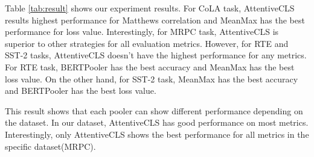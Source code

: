 \documentclass[UTF8]{article}
\begin{document}
Table \ref{tab:result} shows our experiment results. 
For CoLA task, AttentiveCLS results highest performance for Matthews correlation and MeanMax has the best performance for loss value.
Interestingly, for MRPC task, AttentiveCLS is superior to other strategies for all evaluation metrics. 
However, for RTE and SST-2 tasks, AttentiveCLS doesn’t have the highest performance for any metrics. 
For RTE task, BERTPooler has the best accuracy and MeanMax has the best loss value. 
On the other hand, for SST-2 task, MeanMax has the best accuracy and BERTPooler has the best loss value.

This result shows that each pooler can show different performance depending on the dataset. 
In our dataset, AttentiveCLS has good performance on most metrics. Interestingly, only AttentiveCLS shows the best performance for all metrics in the specific dataset(MRPC).




\end{document}
